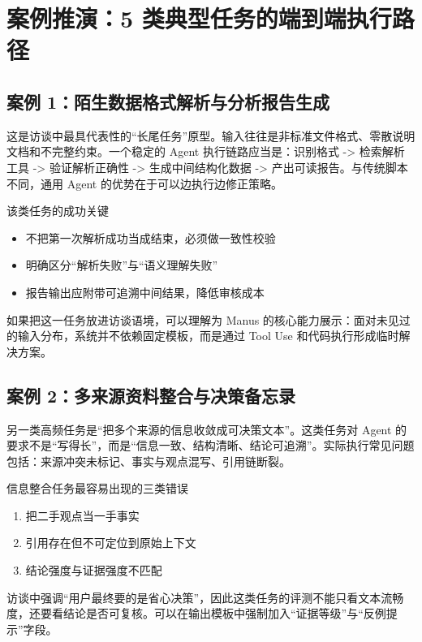 \section{案例推演：5 类典型任务的端到端执行路径}

\subsection{案例 1：陌生数据格式解析与分析报告生成}

这是访谈中最具代表性的“长尾任务”原型。输入往往是非标准文件格式、零散说明文档和不完整约束。一个稳定的 Agent 执行链路应当是：识别格式 -> 检索解析工具 -> 验证解析正确性 -> 生成中间结构化数据 -> 产出可读报告。与传统脚本不同，通用 Agent 的优势在于可以边执行边修正策略。

\begin{importantbox}{该类任务的成功关键}
\begin{itemize}
    \item 不把第一次解析成功当成结束，必须做一致性校验
    \item 明确区分“解析失败”与“语义理解失败”
    \item 报告输出应附带可追溯中间结果，降低审核成本
\end{itemize}
\end{importantbox}

如果把这一任务放进访谈语境，可以理解为 Manus 的核心能力展示：面对未见过的输入分布，系统并不依赖固定模板，而是通过 Tool Use 和代码执行形成临时解决方案。

\subsection{案例 2：多来源资料整合与决策备忘录}

另一类高频任务是“把多个来源的信息收敛成可决策文本”。这类任务对 Agent 的要求不是“写得长”，而是“信息一致、结构清晰、结论可追溯”。实际执行常见问题包括：来源冲突未标记、事实与观点混写、引用链断裂。

\begin{warningbox}{信息整合任务最容易出现的三类错误}
\begin{enumerate}
    \item 把二手观点当一手事实
    \item 引用存在但不可定位到原始上下文
    \item 结论强度与证据强度不匹配
\end{enumerate}
\end{warningbox}

访谈中强调“用户最终要的是省心决策”，因此这类任务的评测不能只看文本流畅度，还要看结论是否可复核。可以在输出模板中强制加入“证据等级”与“反例提示”字段。

